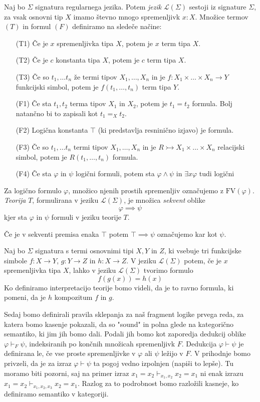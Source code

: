 \begin{definicija}
  Naj bo $\Sigma$ signatura regularnega jezika. Potem \emph{jezik} $\mathcal{L}(\Sigma)$ sestoji iz signature $\Sigma$, za vsak osnovni tip $X$ imamo števno mnogo spremenljivk $x:X$. Množice termov $(T)$ in formul $(F)$ definiramo na sledeče načine:
  \begin{itemize}
    \item [(T1)] Če je $x$ spremenljivka tipa $X$, potem je $x$ term tipa $X$.
    \item [(T2)] Če je $c$ konstanta tipa $X$, potem je $c$ term tipa $X$.
    \item [(T3)] Če so $t_1, \ldots t_n$ že termi tipov $X_1, \ldots, X_n$ in je $f : X_1 \times \ldots \times X_n \to Y$ funkcijski simbol, potem je $f(t_1, \ldots, t_n)$ term tipa $Y$.
    \item [(F1)] Če sta $t_1, t_2$ terma tipov $X_1$ in $X_2$, potem je $t_1 = t_2$ formula. Bolj natančno bi to zapisali kot $t_1 =_X t_2$.
    \item [(F2)] Logična konstanta $\top$ (ki predstavlja resninično izjavo) je formula.
    \item [(F3)] Če so $t_1, \ldots t_n$ termi tipov $X_1, \ldots, X_n$ in je $R \rightarrowtail X_1 \times \ldots \times X_n$ relacijski simbol, potem je $R(t_1, \ldots, t_n)$ formula.
    \item [(F4)] Če sta $\varphi$ in $\psi$ logični formuli, potem sta $\varphi \wedge \psi$ in $\exists x \varphi$ tudi logični 
  \end{itemize}
  Za logično formulo $\varphi$, množico njenih prostih spremenljiv označujemo z $\mathrm{FV}(\varphi)$. \emph{Teorija} $T$, formulirana v jeziku $\mathcal{L}(\Sigma)$, je množica \emph{sekvent} oblike 
  $$\varphi \implies \psi$$
  kjer sta $\varphi$ in $\psi$ formuli v jeziku teorije $T$.
\end{definicija}
Če je v sekventi premisa enaka $\top$ potem $\top \implies \psi$ označujemo kar kot $\psi$.
\begin{primer}
  Naj bo $\Sigma$ signatura s termi osnovnimi tipi $X,Y$ in $Z$, ki vsebuje tri funkcijske simbole $f: X \to Y$, $g : Y \to Z$ in $h : X \to Z$. V jeziku $\mathcal{L}(\Sigma)$ potem, če je $x$ spremenljivka tipa $X$, lahko v jeziku $\mathcal{L}(\Sigma)$ tvorimo formulo
  $$f(g(x)) = h(x)$$
  Ko definiramo interpretacijo teorije bomo videli, da je to ravno formula, ki pomeni, da je $h$ kompozitum $f$ in $g$.
\end{primer}
Sedaj bomo definirali pravila sklepanja za naš fragment logike prvega reda, za katera bomo kasenje pokazali, da so "sound" in polna glede na kategorično semantiko, ki jim jih bomo dali.
Podali jih bomo kot zaporedja dedukcij oblike $\varphi \vdash_F \psi$, indeksiranih po končnih množicah spremenljivk $F$. Dedukcija $\varphi \vdash \psi$ je definirana le, če vse proste spremenljivke v $\varphi$ ali $\psi$ ležijo v $F$. V prihodnje bomo privzeli, da je za izraz $\varphi \vdash \psi$ ta pogoj vedno izpolnjen (napiši to lepše).
Tu moramo biti pozorni, saj na primer izraz $x_1 = x_2 \vdash_{x_1, x_2} x_2 = x_1$ ni enak izrazu $x_1 = x_2 \vdash_{x_1, x_2, x_3} x_2 = x_1$. Razlog za to podrobnost bomo razložili kasneje, ko definiramo semantiko v kategoriji.

